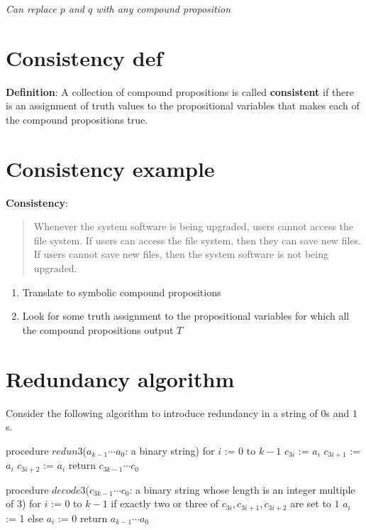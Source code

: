 \documentclass[12pt, oneside]{article}
\begin{document}
{\it Can replace $p$ and $q$ with any compound proposition}
 \vfill
\section*{Consistency def}


{\bf Definition}: A collection of  compound  propositions
is called {\bf consistent} if  there
is  an assignment  of  truth values
to  the  propositional variables that makes
each of the compound propositions  true.
 \vfill
\section*{Consistency example}


{\bf Consistency}: 
\begin{quote}
Whenever the system software is being upgraded, users cannot access the file system. 
If users can access the file system, then they can save new files. 
If users cannot save new files, then the system software is not being upgraded.
\end{quote}

\begin{enumerate}
\item Translate to symbolic compound propositions
\vfill
\item Look for some truth assignment to the propositional variables for which all the compound propositions output $T$
\vfill
\end{enumerate} \vfill
\section*{Redundancy algorithm}


Consider the following algorithm to introduce redundancy in a string of $0$s and $1$s.
\begin{algorithm}[caption={Create redundancy by repeating each bit three times}]
procedure $\textit{redun3}$($a_{k-1} \cdots a_0$: a binary string)
for $i$ := $0$ to $k-1$
  $c_{3i}$ := $a_i$
  $c_{3i+1}$ := $a_i$
  $c_{3i+2}$ := $a_i$
return $c_{3k-1} \cdots c_0$
\end{algorithm}

\begin{algorithm}[caption={Decode sequence of bits using majority rule on consecutive three bit sequences}]
procedure $\textit{decode3}$($c_{3k-1} \cdots c_0$: a binary string whose length is an integer multiple of $3$)
for $i$ := $0$ to $k-1$
  if exactly two or three of $c_{3i}, c_{3i+1}, c_{3i+2}$ are set to $1$
    $a_i$ := 1
  else 
    $a_i$ := 0
return $a_{k-1} \cdots a_0$
\end{algorithm}
\end{document}

